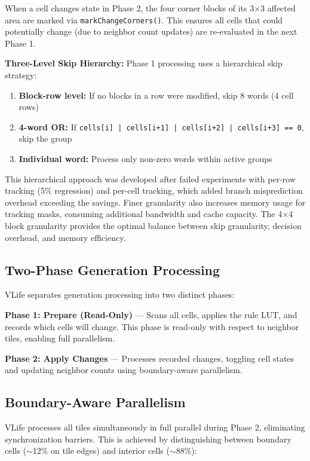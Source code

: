 \documentclass[11pt]{article}
\theoremstyle{definition}
\begin{document}
    When a cell changes state in Phase 2, the four corner blocks of its 3$\times$3 affected area are marked via \texttt{markChangeCorners()}. This ensures all cells that could potentially change (due to neighbor count updates) are re-evaluated in the next Phase 1.

    \textbf{Three-Level Skip Hierarchy:} Phase 1 processing uses a hierarchical skip strategy:
    \begin{enumerate}
        \item \textbf{Block-row level:} If no blocks in a row were modified, skip 8 words (4 cell rows)
        \item \textbf{4-word OR:} If \texttt{cells[i] | cells[i+1] | cells[i+2] | cells[i+3] == 0}, skip the group
        \item \textbf{Individual word:} Process only non-zero words within active groups
    \end{enumerate}

    This hierarchical approach was developed after failed experiments with per-row tracking (5\% regression) and per-cell tracking, which added branch misprediction overhead exceeding the savings. Finer granularity also increases memory usage for tracking masks, consuming additional bandwidth and cache capacity. The 4$\times$4 block granularity provides the optimal balance between skip granularity, decision overhead, and memory efficiency.

    \subsection{Two-Phase Generation Processing}

    VLife separates generation processing into two distinct phases:

    \textbf{Phase 1: Prepare (Read-Only)} --- Scans all cells, applies the rule LUT, and records which cells will change. This phase is read-only with respect to neighbor tiles, enabling full parallelism.

    \textbf{Phase 2: Apply Changes} --- Processes recorded changes, toggling cell states and updating neighbor counts using boundary-aware parallelism.

    \subsection{Boundary-Aware Parallelism}

    VLife processes all tiles simultaneously in full parallel during Phase 2, eliminating synchronization barriers. This is achieved by distinguishing between boundary cells ($\sim$12\% on tile edges) and interior cells ($\sim$88\%):
\end{document}
